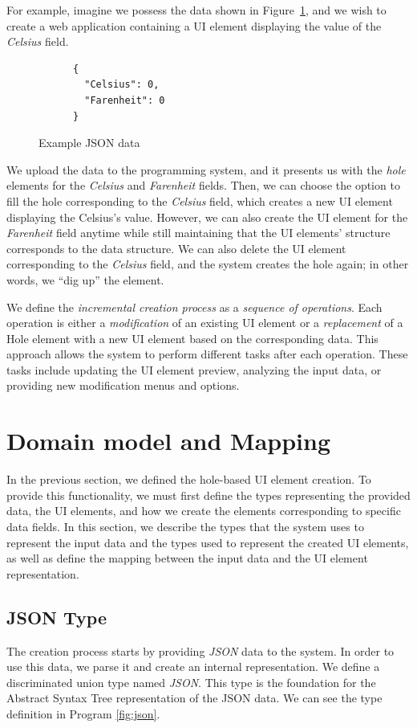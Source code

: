 For example, imagine we possess the data shown in Figure~\ref{fig:part-json}, and we wish to create a web application containing a UI element displaying the value of the \emph{Celsius} field.
\begin{figure}[htbp]
	\begin{lstlisting} 
      {
        "Celsius": 0,
        "Farenheit": 0
      }
    \end{lstlisting}
	\caption{Example JSON data}\label{fig:part-json}
\end{figure}
We upload the data to the programming system, and it presents us with the \emph{hole} elements for the \emph{Celsius} and \emph{Farenheit} fields.
Then, we can choose the option to fill the hole corresponding to the \emph{Celsius} field, which creates a new UI element displaying the Celsius's value.
However, we can also create the UI element for the \emph{Farenheit} field anytime while still maintaining that the UI elements' structure corresponds to the data structure.
We can also delete the UI element corresponding to the \emph{Celsius} field, and the system creates the hole again; in other words, we ``dig up'' the element.

We define the \emph{incremental creation process} as a \emph{sequence of operations}.
Each operation is either a \emph{modification} of an existing UI element or a \emph{replacement} of a Hole element with a new UI element based on the corresponding data.
This approach allows the system to perform different tasks after each operation.
These tasks include updating the UI element preview, analyzing the input data, or providing new modification menus and options.

\section{Domain model and Mapping}
\label{sec:types}

In the previous section, we defined the hole-based UI element creation. To provide this functionality, we must first define the types representing the provided data, the UI elements, and how we create the elements corresponding to specific data fields.
In this section, we describe the types that the system uses to represent the input data and the types used to represent the created UI elements,
as well as define the mapping between the input data and the UI element representation.


\subsection{JSON Type}
\label{sub:json}
The creation process starts by providing \emph{JSON} data to the system.
In order to use this data, we parse it and create an internal representation.
We define a discriminated union type named \emph{JSON}.
This type is the foundation for the Abstract Syntax Tree representation of the JSON data.
We can see the type definition in Program \ref{fig:json}.



